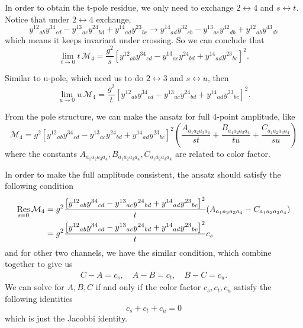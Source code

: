 \documentclass[12pt]{article}
\begin{document}
In order to obtain the t-pole residue, we only need to exchange $2\leftrightarrow 4$ and $s \leftrightarrow t$. Notice that under $2\leftrightarrow 4$ exchange,
\begin{equation}
    y^{12}{}_{ab} y^{34}{}_{cd}- y^{13}{}_{ac} y^{24}{}_{bd}+ y^{14}{}_{ad} y^{23}{}_{bc} \rightarrow y^{14}{}_{ad} y^{32}{}_{cb}- y^{13}{}_{ac} y^{42}{}_{db}+ y^{12}{}_{ab} y^{43}{}_{dc}
\end{equation}
which means it keeps invariant under crossing. So we can conclude that 
\begin{equation}
\lim_{t \to 0} t\,\mathcal{M}_4
= \frac{g^{2}}{s}
\left[
y^{12}{}_{ab} y^{34}{}_{cd}
- y^{13}{}_{ac} y^{24}{}_{bd}
+ y^{14}{}_{ad} y^{23}{}_{bc}
\right]^{2}.
\end{equation}

Similar to u-pole, which need us to do $2 \leftrightarrow 3$ and $s \leftrightarrow u$, then 
\begin{equation}
\lim_{u \to 0} u\,\mathcal{M}_4
= \frac{g^{2}}{t}
\left[
y^{12}{}_{ab} y^{34}{}_{cd}
- y^{13}{}_{ac} y^{24}{}_{bd}
+ y^{14}{}_{ad} y^{23}{}_{bc}
\right]^{2}.
\end{equation}

From the pole structure, we can make the ansatz for full 4-point amplitude, like 
\begin{equation}
    \mathcal{M}_4=g^2\left[
y^{12}{}_{ab} y^{34}{}_{cd}
- y^{13}{}_{ac} y^{24}{}_{bd}
+ y^{14}{}_{ad} y^{23}{}_{bc}
\right]^{2} \left(\frac{A_{a_1a_2a_3a_4}}{st}+\frac{B_{a_1a_2a_3a_4}}{tu}+\frac{C_{a_1a_2a_3a_4}}{su}\right) 
\end{equation}
where the constants $A_{a_1a_2a_3a_4},B_{a_1a_2a_3a_4},C_{a_1a_2a_3a_4}$ are related to color factor.

In order to make the full amplitude consistent, the ansatz should satisfy the following condition
\begin{align}
    \mathop{\mathrm{Res}}_{s=0}\mathcal{M}_4&=g^2\frac{\left[
y^{12}{}_{ab} y^{34}{}_{cd}
- y^{13}{}_{ac} y^{24}{}_{bd}
+ y^{14}{}_{ad} y^{23}{}_{bc}
\right]^{2}}{t}(A_{a_1a_2a_3a_4}-C_{a_1a_2a_3a_4})\notag \\
&=g^2\frac{\left[
y^{12}{}_{ab} y^{34}{}_{cd}
- y^{13}{}_{ac} y^{24}{}_{bd}
+ y^{14}{}_{ad} y^{23}{}_{bc}
\right]^{2}}{t}c_s
\end{align}
and for other two channels, we have the similar condition, which combine together to give us
\begin{gather}
    C-A=c_s,\quad A-B=c_t,\quad B-C=c_u.
\end{gather}
We can solve for $A,B,C$ if and only if the color factor $c_s,c_t,c_u$ satisfy the following identities
\begin{equation}
    c_s+c_t+c_u=0
\end{equation}
which is just the Jacobbi identity.
\end{document}
